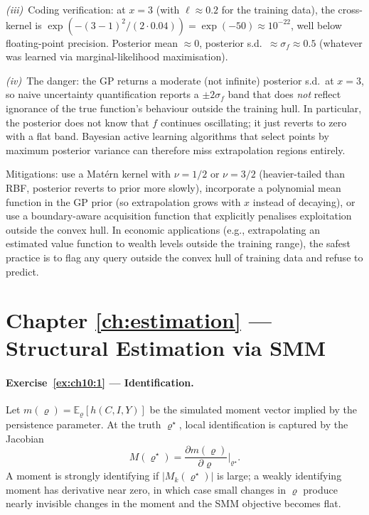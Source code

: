 \documentclass[11pt,a4paper]{report}
\begin{document}
\emph{(iii)}~Coding verification: at $x = 3$ (with $\ell \approx 0.2$ for the training data), the cross-kernel is $\exp(-(3-1)^2/(2\cdot 0.04)) = \exp(-50) \approx 10^{-22}$, well below floating-point precision.  Posterior mean $\approx 0$, posterior s.d.\ $\approx \sigma_f \approx 0.5$ (whatever was learned via marginal-likelihood maximisation).

\emph{(iv)}~The danger: the GP returns a moderate (not infinite) posterior s.d.\ at $x = 3$, so naive uncertainty quantification reports a $\pm 2\sigma_f$ band that does \emph{not} reflect ignorance of the true function's behaviour outside the training hull.  In particular, the posterior does not know that $f$ continues oscillating; it just reverts to zero with a flat band.  Bayesian active learning algorithms that select points by maximum posterior variance can therefore miss extrapolation regions entirely.

Mitigations: use a Matérn kernel with $\nu = 1/2$ or $\nu = 3/2$ (heavier-tailed than RBF, posterior reverts to prior more slowly), incorporate a polynomial mean function in the GP prior (so extrapolation grows with $x$ instead of decaying), or use a boundary-aware acquisition function that explicitly penalises exploitation outside the convex hull.  In economic applications (e.g., extrapolating an estimated value function to wealth levels outside the training range), the safest practice is to flag any query outside the convex hull of training data and refuse to predict.

\section{Chapter \ref{ch:estimation} --- Structural Estimation via SMM}
\label{sol:ch10}

\paragraph{Exercise~\ref{ex:ch10:1} --- Identification.}
Let $m(\varrho)=\mathbb{E}_\varrho[h(C,I,Y)]$ be the simulated moment vector implied by the persistence parameter.  At the truth $\varrho^\star$, local identification is captured by the Jacobian
\[
   M(\varrho^\star)
   =
   \frac{\partial m(\varrho)}{\partial \varrho}\bigg|_{\varrho^\star}.
\]
A moment is strongly identifying if $|M_k(\varrho^\star)|$ is large; a weakly identifying moment has derivative near zero, in which case small changes in $\varrho$ produce nearly invisible changes in the moment and the SMM objective becomes flat.
\end{document}
